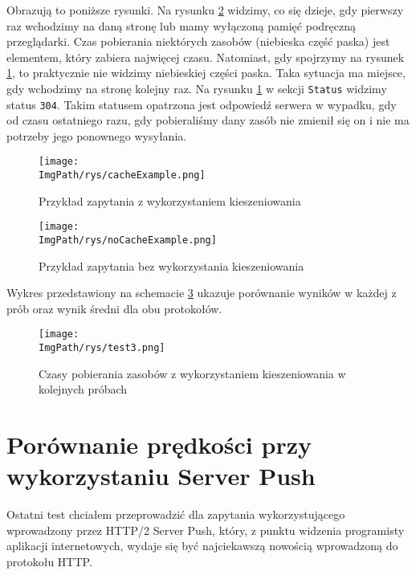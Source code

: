 \documentclass[a4paper,12pt,twoside,openany]{report}
\newcommand{\ImgPath}{.}
\begin{document}
Obrazują to poniższe rysunki. Na rysunku \ref{schematNoCacheExample} widzimy, co się dzieje, gdy pierwszy raz wchodzimy na daną stronę lub mamy wyłączoną pamięć podręczną przeglądarki.
Czas pobierania niektórych zasobów (niebieska część paska) jest elementem, który zabiera najwięcej czasu.
Natomiast, gdy spojrzymy na rysunek \ref{schematCacheExample}, to praktycznie nie widzimy niebieskiej części paska.
Taka sytuacja ma miejsce, gdy wchodzimy na stronę kolejny raz.
Na rysunku \ref{schematCacheExample} w sekcji \texttt{Status} widzimy status \texttt{304}.
Takim statusem opatrzona jest odpowiedź serwera w wypadku, gdy od czasu ostatniego razu, gdy pobieraliśmy dany zasób nie zmienił się on i nie ma potrzeby jego ponownego wysyłania.
\begin{figure}[!htbp]
	\begin{center}
\centering
\texttt{[image: \\ImgPath/rys/cacheExample.png]}
\end{center}
	\caption{Przykład zapytania z wykorzystaniem kieszeniowania}
	\label{schematCacheExample}
\end{figure}

\begin{figure}[!htbp]
	\begin{center}
\centering
\texttt{[image: \\ImgPath/rys/noCacheExample.png]}
\end{center}
	\caption{Przykład zapytania bez wykorzystania kieszeniowania}
	\label{schematNoCacheExample}
\end{figure}

Wykres przedstawiony na schemacie \ref{schematTest3} ukazuje porównanie wyników w każdej z prób oraz wynik średni dla obu protokołów.

\begin{figure}[!htbp]
	\begin{center}
\centering
\texttt{[image: \\ImgPath/rys/test3.png]}
\end{center}
	\caption{Czasy pobierania zasobów z wykorzystaniem kieszeniowania w kolejnych próbach}
	\label{schematTest3}
\end{figure}

\section{Porównanie prędkości przy wykorzystaniu Server Push}
\label{pushSection}

Ostatni test chciałem przeprowadzić dla zapytania wykorzystującego wprowadzony przez HTTP/2 Server Push, który, z punktu widzenia programisty aplikacji internetowych, wydaje się być najciekawszą nowością wprowadzoną do protokołu HTTP.
\end{document}

